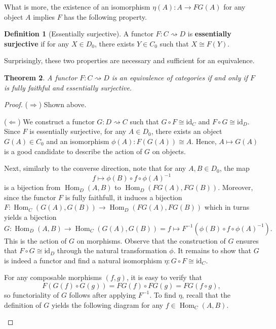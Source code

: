 \documentclass{article}
\newtheorem{thm}{Theorem}
\theoremstyle{definition}
\newtheorem{defn}[thm]{Definition}
\theoremstyle{remark}
\DeclareMathOperator{\Hom}{Hom}
\newcommand{\id}{\text{id}}
\begin{document}
What is more, the existence of an isomorphism $\eta(A): A \rightarrow FG(A)$ for any object $A$ implies $F$ has the following property.
\begin{defn}[Essentially surjective]
	A functor $F:C\rightsquigarrow D$ is \textbf{essentially surjective} if for any $X \in D_0$, there exists $Y \in C_0$ such that $X \cong F(Y)$.
\end{defn}
Surprisingly, these two properties are necessary and sufficient for an equivalence.
\newpage
\begin{thm}
	A functor $F:C\rightsquigarrow D$ is an equivalence of categories if and only if $F$ is fully faithful and essentially surjective.
\end{thm}
\begin{proof}
	($\Rightarrow$) Shown above.
	
	($\Leftarrow$) We construct a functor $G:D\rightsquigarrow C$ such that $G\circ F \cong \id_C$ and $F\circ G \cong \id_D$. Since $F$ is essentially surjective, for any $A \in D_0$, there exists an object $G(A) \in C_0$ and an isomorphism $\phi(A):F(G(A)) \cong A$. Hence, $A \mapsto G(A)$ is a good candidate to describe the action of $G$ on objects.
	
	Next, similarly to the converse direction, note that for any $A,B \in D_0$, the map 
	\[f\mapsto \phi(B) \circ f \circ \phi(A)^{-1}\]
	is a bijection from $\Hom_D(A,B)$ to $\Hom_D(FG(A), FG(B))$. Moreover, since the functor $F$ is fully faithfull, it induces a bijection $F: \Hom_C(G(A), G(B)) \rightarrow \Hom_D(FG(A), FG(B))$ which in turns yields a bijection 
	\[G: \Hom_D(A,B) \rightarrow \Hom_C(G(A), G(B)) = f \mapsto F^{-1}(\phi(B) \circ f \circ \phi(A)^{-1}).\]
	This is the action of $G$ on morphisms. Observe that the construction of $G$ ensures that $F\circ G \cong \id_D$ through the natural transformation $\phi$. It remains to show that $G$ is indeed a functor and find a natural isomorphism $\eta:G\circ F \cong \id_C$.
	
	For any composable morphisms $(f,g)$, it is easy to verify that 
	\[F(G(f)\circ G(g)) = FG(f) \circ FG(g) = FG(f \circ g),\]
	so functoriality of $G$ follows after applying $F^{-1}$. To find $\eta$, recall that the definition of $G$ yields the following diagram for any $f\in \Hom_C(A,B)$.
	\begin{figure}[H]
		\centering
	\end{figure}
	

\end{proof}
\end{document}
